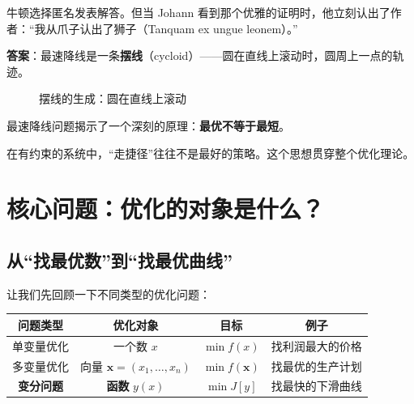 牛顿选择匿名发表解答。但当 Johann 看到那个优雅的证明时，他立刻认出了作者：“我从爪子认出了狮子（Tanquam ex ungue leonem）。”

\textbf{答案}：最速降线是一条\textbf{摆线}（cycloid）——圆在直线上滚动时，圆周上一点的轨迹。

\begin{figure}[htbp]
\centering
{}
\caption{摆线的生成：圆在直线上滚动}
\end{figure}

\begin{insightbox}
最速降线问题揭示了一个深刻的原理：\textbf{最优不等于最短}。

在有约束的系统中，“走捷径”往往不是最好的策略。这个思想贯穿整个优化理论。
\end{insightbox}

\section{核心问题：优化的对象是什么？}

\subsection{从“找最优数”到“找最优曲线”}

让我们先回顾一下不同类型的优化问题：

\begin{center}
\renewcommand{\arraystretch}{1.5}
\begin{tabular}{c|c|c|c}
\toprule
\textbf{问题类型} & \textbf{优化对象} & \textbf{目标} & \textbf{例子} \\
\midrule
单变量优化 & 一个数 $x$ & $\min f(x)$ & 找利润最大的价格 \\
\midrule
多变量优化 & 向量 $\mathbf{x} = (x_1, \ldots, x_n)$ & $\min f(\mathbf{x})$ & 找最优的生产计划 \\
\midrule
\textbf{变分问题} & \textbf{函数} $y(x)$ & $\min J[y]$ & 找最快的下滑曲线 \\
\bottomrule
\end{tabular}
\end{center}

